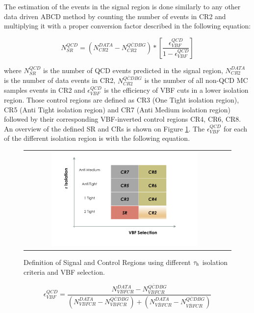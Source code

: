 The estimation of the events in the signal region is done similarly to any other data driven ABCD method by counting the number of events in CR2 and multiplying it with a proper conversion factor described in the following equation:

\begin{equation}
N^{QCD}_{SR} = \left( N^{DATA}_{CR2} - N^{\overline{QCD} BG}_{CR2} \right) * \left[ \frac{\epsilon^{QCD}_{VBF}}{1 - \epsilon^{QCD}_{VBF}} \right]
\label{eq:qcdbgpred}
\end{equation}

where $N^{QCD}_{SR}$ is the number of QCD events predicted in the signal region, $N^{DATA}_{CR2}$ is the number of data events in CR2, $N^{\overline{QCD} BG}_{CR2}$ is the number of all non-QCD MC samples events in CR2 and $\epsilon^{QCD}_{VBF}$ is the efficiency of VBF cuts in a lower \hadtau isolation region. Those  control regions are defined as CR3 (One Tight isolation region), CR5  (Anti Tight isolation region) and CR7 (Anti Medium isolation region) followed by their corresponding VBF-inverted control regions CR4, CR6, CR8. An overview of the defined SR and CRs is shown on Figure \ref{fig:crs}. The $\epsilon^{QCD}_{VBF}$ for each of the different \hadtau isolation region is with the following equation.

\begin{figure}[tbh!]
	\centering
	\begin{tabular}{cc}
		\includegraphics[width=0.75\textwidth]{PLOTS/diTauHadLSotherPlots/controlregions.png}
	\end{tabular}
	\caption{Definition of Signal and Control Regions using different $\tau_{\text{h}}$ isolation criteria and VBF selection.}
	\label{fig:crs}
\end{figure}

\begin{equation}
\epsilon^{QCD}_{VBF} = \frac {N^{DATA}_{VBF CR} - N^{\overline{QCD} BG}_{VBFCR}}{\left( N^{DATA}_{VBFCR} - N^{\overline{QCD} BG}_{VBFCR} \right) + \left( N^{DATA}_{\overline{VBF}CR} - N^{\overline{QCD} BG}_{\overline{VBF}CR} \right) }
\label{eq:vbfeff}
\end{equation}

